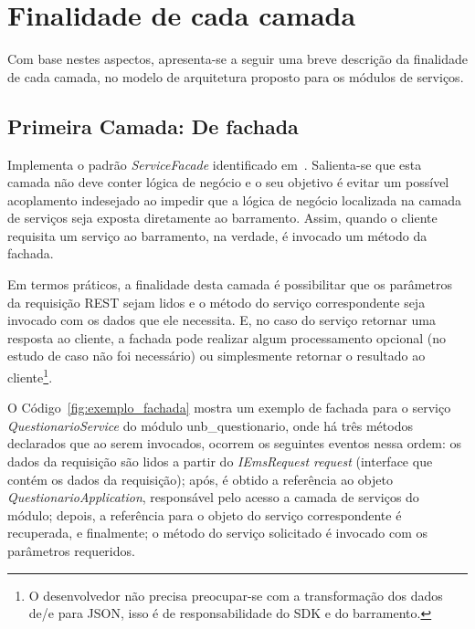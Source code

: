 \section{Finalidade de cada camada}

Com base nestes aspectos, apresenta-se a seguir uma 
breve descrição da finalidade de cada camada,
no modelo de arquitetura proposto para 
os módulos de serviços.

\subsection{Primeira Camada: De fachada}
	
	Implementa 
	o padrão \emph{ServiceFacade} 
	identificado em~\cite{SOA_patterns_2012}.
	Salienta-se que esta camada não deve 
	conter	lógica de negócio e 
	o seu objetivo é evitar 
	um possível acoplamento indesejado
	ao impedir que a lógica de negócio 
	localizada na camada de serviços
	seja exposta diretamente ao barramento.
	Assim, quando o cliente requisita um 
	serviço ao barramento,
	na verdade, é invocado um 
	método da fachada.

	Em termos práticos, a finalidade
	desta camada é possibilitar que 
	os parâmetros da requisição \acrshort{REST}
	sejam lidos e o método do serviço correspondente seja invocado
	com os dados que ele necessita. E, 
	no caso do serviço retornar
	uma resposta ao cliente, a fachada pode 
	realizar algum 
	processamento opcional (no estudo de caso não foi necessário)
	ou simplesmente retornar o 
	resultado ao cliente\footnote{O
	desenvolvedor não precisa preocupar-se 
	com a transformação dos dados de/e para \acrshort{JSON}, 
	isso é de responsabilidade do \acrshort{SDK} e do barramento.}.

	O Código~\ref{fig:exemplo_fachada} mostra um exemplo
	de fachada para o serviço \emph{QuestionarioService}
	do módulo unb\_questionario,
	onde há três métodos declarados que ao serem
	invocados, ocorrem os 
	seguintes eventos nessa ordem: 
	os dados da requisição
	são lidos a partir do \emph{IEmsRequest request}
	(interface que contém os dados da requisição); 
	após, é obtido a referência ao objeto \emph{QuestionarioApplication}, 
	responsável pelo acesso a camada de serviços do módulo; depois,
	a referência para o objeto do serviço correspondente é recuperada, 
	e finalmente; o método do serviço solicitado é invocado
	com os parâmetros requeridos.
	
	 
	
	
             
